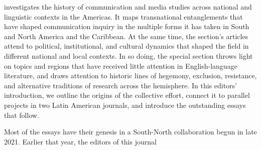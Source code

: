 \documentclass{tufte-handout}
\begin{document}
\begin{titlepage}
\begin{fullwidth}
\vspace*{0.75em} %

\vspace*{0.5em}

\end{fullwidth}

\vspace*{1em}


 investigates the history of communication and media
studies across national and linguistic contexts in the Americas. It maps
transnational entanglements that have shaped communication inquiry in
the multiple forms it has taken in South and North America and the
Caribbean. At the same time, the section's articles attend to political,
institutional, and cultural dynamics that shaped the field in different
national and local contexts. In so doing, the special section throws
light on topics and regions that have received little attention in
English-language literature, and draws attention to historic lines of
hegemony, exclusion, resistance, and alternative traditions of research
across the hemisphere. In this editors' introduction, we outline the
origins of the collective effort, connect it to parallel projects in two
Latin American journals, and introduce the outstanding essays that
follow.

Most of the essays have their genesis in a South-North collaboration
begun in late 2021. Earlier that year, the editors of this journal

\enlargethispage{2\baselineskip}

\vspace*{2em}



 \end{titlepage}

\end{document}
